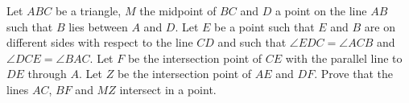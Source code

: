 Let $ABC$ be a triangle,
$M$ the midpoint of $BC$ and $D$ a point on the line $AB$ such that $B$ lies between $A$ and $D$.
Let $E$ be a point such that $E$ and $B$ are on different sides with respect to the line $CD$
and such that $\angle EDC = \angle ACB$ and $\angle DCE = \angle BAC$.
Let $F$ be the intersection point of $CE$ with the parallel line to $DE$ through $A$.
Let $Z$ be the intersection point of $AE$ and $DF$.
Prove that the lines $AC$, $BF$ and $MZ$ intersect in a point.
